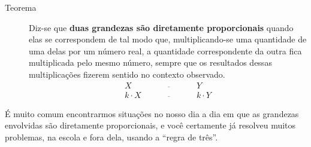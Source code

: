 \begin{description}
\item[Teorema]
\leavevmode{}\label{\detokenize{AF107-0:term-grandezas-diretamente-proporcionais}}
Diz-se que \textbf{duas grandezas são diretamente proporcionais} quando elas se correspondem de tal modo que, multiplicando-se uma quantidade de uma delas por um número real, a quantidade correspondente da outra fica multiplicada pelo mesmo número, sempre que os resultados dessas multiplicações fizerem sentido no contexto observado.
\[\begin{array}{ccc}
X\quad &\overline{\quad \quad \quad}& \quad Y \\
k\cdot X \quad &\overline{\quad \quad \quad}& \quad k\cdot Y
\end{array}\]
\end{description}

É muito comum encontrarmos situações no nosso dia a dia em que as grandezas envolvidas são diretamente proporcionais, e você certamente já resolveu muitos problemas, na escola e fora dela, usando a “regra de três”.

